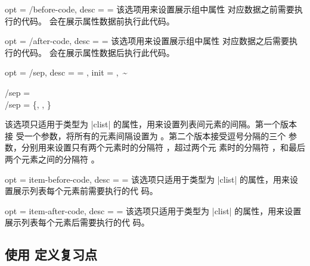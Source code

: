 \documentclass[full]{l3doc}
\begin{document}
\begin{documentation}
\begin{option}{
  opt = {/before-code},
  desc = {= }
}
  该选项用来设置展示组中属性  对应数据之前需要执行的代码。
  会在展示属性数据前执行此代码。
\end{option}

\begin{option}{
  opt = {/after-code},
  desc = {= }
}
  该选项用来设置展示组中属性  对应数据之后需要执行的代码。
  会在展示属性数据后执行此代码。
\end{option}

\begin{option}{
  opt = {/sep},
  desc = {= },
  init = {,~\~}
}
\begin{Syntax}
  /sep =  \\
  /sep = \{, , \}
\end{Syntax}

  该选项只适用于类型为 |clist| 的属性，用来设置列表间元素的间隔。第一个版本接
  受一个参数，将所有的元素间隔设置为 。第二个版本接受逗号分隔的三个
  参数，分别用来设置只有两个元素时的分隔符 ，超过两个元
  素时的分隔符 ，和最后两个元素之间的分隔符
  。

\end{option}

\begin{option}{
  opt = item-before-code,
  desc = {= }
}
  该选项只适用于类型为 |clist| 的属性，用来设置展示列表每个元素前需要执行的代
  码。
\end{option}

\begin{option}{
  opt = item-after-code,
  desc = {= }
}
  该选项只适用于类型为 |clist| 的属性，用来设置展示列表每个元素后需要执行的代
  码。
\end{option}

\subsection{使用  定义复习点}

\begin{function}{\rvNewReviewPoints}
  \begin{syntax}
      
  \end{syntax}


\end{function}
\end{documentation}
\end{document}

